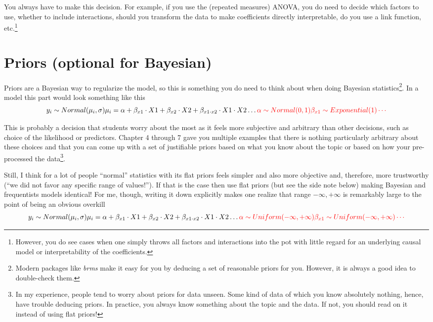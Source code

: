 \documentclass[
]{book}
\begin{document}
You always have to make this decision. For example, if you use the (repeated measures) ANOVA, you do need to decide which factors to use, whether to include interactions, should you transform the data to make coefficients directly interpretable, do you use a link function, etc.\footnote{However, you do see cases when one simply throws all factors and interactions into the pot with little regard for an underlying causal model or interpretability of the coefficients.}

\hypertarget{priors-optional-for-bayesian}{%
\section{Priors (optional for Bayesian)}\label{priors-optional-for-bayesian}}

Priors are a Bayesian way to regularize the model, so this is something you do need to think about when doing Bayesian statistics\footnote{Modern packages like \emph{brms} make it easy for you by deducing a set of reasonable priors for you. However, it is always a good idea to double-check them.}. In a model this part would look something like this
\[
y_i \sim Normal(\mu_i, \sigma) \\
\mu_i = \alpha + \beta_{x1} \cdot X1 + \beta_{x2} \cdot X2 + \beta_{x1\cdot x2} \cdot X1 \cdot X2 \dotso \\
\color{red}{\alpha \sim Normal(0, 1) \\
\beta_{x1} \sim Exponential(1) \\
\cdots}
\]

This is probably a decision that students worry about the most as it feels more subjective and arbitrary than other decisions, such as choice of the likelihood or predictors. Chapter 4 through 7 gave you multiple examples that there is nothing particularly arbitrary about these choices and that you can come up with a set of justifiable priors based on what you know about the topic or based on how your pre-processed the data\footnote{In my experience, people tend to worry about priors for data unseen. Some kind of data of which you know absolutely nothing, hence, have trouble deducing priors. In practice, you always know something about the topic and the data. If not, you should read on it instead of using flat priors!}.

Still, I think for a lot of people ``normal'' statistics with its flat priors feels simpler and also more objective and, therefore, more trustworthy (``we did not favor any specific range of values!''). If that is the case then use flat priors (but see the side note below) making Bayesian and frequentists models identical! For me, though, writing it down explicitly makes one realize that range \(-\infty, +\infty\) is remarkably large to the point of being an obvious overkill
\[
y_i \sim Normal(\mu_i, \sigma) \\
\mu_i = \alpha + \beta_{x1} \cdot X1 + \beta_{x2} \cdot X2 + \beta_{x1\cdot x2} \cdot X1 \cdot X2 \dotso \\
\color{red}{\alpha \sim Uniform(-\infty, +\infty) \\
\beta_{x1} \sim Uniform(-\infty, +\infty) \\
\cdots}
\]
\end{document}
